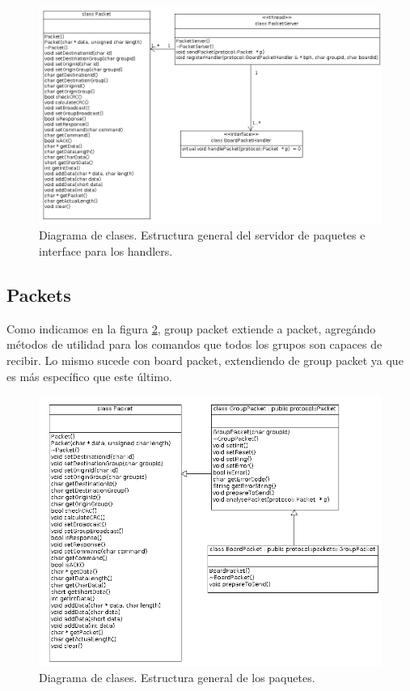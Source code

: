 \begin{figure}[ht]
	\centering
	\includegraphics[scale=0.483]{comportamientos/figures/cs4.png}
	\caption[Diagrama de clases: Servidor de paquetes e interface]
			{Diagrama de clases. Estructura general del servidor de paquetes
			e interface para los handlers.}
	\label{fig:diag_server_handler_packet}
\end{figure}
\subsection{Packets}
Como indicamos en la figura \ref{fig:packet_group_board}, group packet extiende
a packet, agreg\'ando m\'etodos de utilidad para los comandos que todos
los grupos son capaces de recibir. Lo mismo sucede con board packet,
extendiendo de group packet ya que es m\'as espec\'ifico que este \'ultimo.

\begin{figure}[ht]
	\centering
	\includegraphics[scale=0.5]{comportamientos/figures/cs1.png}
	\caption[Diagrama de clases: Estructura general]{Diagrama de clases. Estructura general de los paquetes.}
	\label{fig:packet_group_board}
\end{figure}

